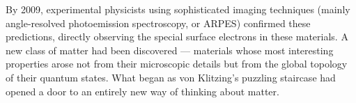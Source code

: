 \begin{historical}
By 2009, experimental physicists using sophisticated imaging techniques (mainly angle-resolved photoemission spectroscopy, or ARPES) confirmed these predictions, directly observing the special surface electrons in these materials. A new class of matter had been discovered — materials whose most interesting properties arose not from their microscopic details but from the global topology of their quantum states. What began as von Klitzing's puzzling staircase had opened a door to an entirely new way of thinking about matter.
\end{historical}
